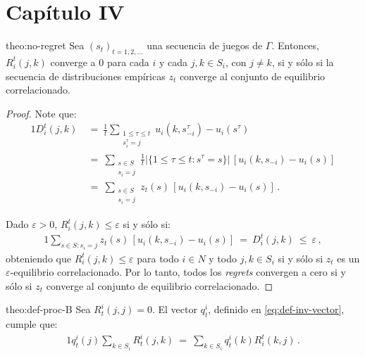 \section*{Capítulo IV}

\begin{reptheorem}{theo:no-regret}
Sea $(s_t)_{t = 1, 2, ...}$ una secuencia de juegos de $\Gamma$.
Entonces, $R_i^t(j, k)$ converge a $0$ para cada $i$ y cada $j, k \in S_i$, con $j \neq k$, si y sólo si la secuencia de distribuciones empíricas $z_t$ converge al conjunto de equilibrio correlacionado.
\end{reptheorem}

\begin{proof}
Note que:
\begin{alignat}{1}
  D_i^t(j, k)\ 
    &=\ \frac{1}{t} \sum_{\substack{1\leq \tau \leq t \\ s_i^{\tau}=j}} u_i(k, s_{-i}^{\tau}) - u_i(s^{\tau}) \\
    &=\ \sum_{ \substack{s \in S \\ s_i = j}} \frac{1}{t} |\{1\leq\tau \leq t : s^{\tau} = s\}|\,[u_i(k, s_{-i}) - u_i(s)] \\
    &=\ \sum_{ \substack{s \in S \\ s_i = j}} z_t(s)\,[u_i(k, s_{-i}) - u_i(s)] \,.
\end{alignat}

Dado $\varepsilon > 0$, $R_i^t(j, k) \leq \varepsilon$ si y sólo si:
\begin{alignat}{1}
    \sum_{s \in S : s_i = j} z_t(s)\,[u_i(k, s_{-i}) - u_i(s)]\  =\ D_i^t(j, k)\ \leq \ \varepsilon \,,
\end{alignat}
obteniendo que $R_i^t(j, k) \leq \varepsilon$ para todo $i \in N$ y todo $j, k \in S_i$ si y sólo si $z_t$ es un $\varepsilon$-equilibrio correlacionado. Por lo tanto, todos los \textit{regrets} convergen a cero si y sólo si $z_t$ converge al conjunto de equilibrio correlacionado.
\end{proof}

\begin{reptheorem}{theo:def-proc-B}
Sea $R_t^i(j, j) = 0$. El vector $q_t^i$, definido en \ref{eq:def-inv-vector}, cumple que:
\begin{alignat}{1}
q^i_t(j)\sum_{k \in S_i} R^i_t(j,k)\ =\ \sum_{k \in S_i} q_t^i(k)R_i^t(k,j) \,.
\end{alignat}
\end{reptheorem}

